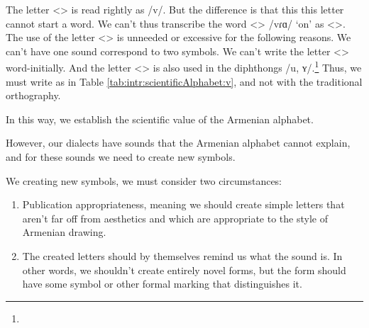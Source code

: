 The letter <> is read rightly as /v/. But the difference is that this this letter cannot start a word. We can't thus transcribe the word <> /vɾɑ/ `on' as <>. The use of the letter <> is unneeded or excessive for the following reasons. We can't have one sound correspond to two symbols. We can't write the letter <> word-initially. And the letter <> is also used in the diphthongs  /u, ʏ/.\footnote{} Thus, we must write as in Table \ref{tab:intr:scientificAlphabet:v}, and not with the traditional orthography. 



\begin{table}[H]
	\centering
	\caption{Transcribing the letter <> }\label{tab:intr:scientificAlphabet:v}
	\end{table}




In this way, we establish the scientific value of the Armenian alphabet.

However, our dialects have sounds that the Armenian alphabet cannot explain, and for these sounds we need to create new symbols. 

We creating new symbols, we must consider two circumstances:
\begin{enumerate}
	\item Publication appropriateness, meaning we should create simple letters that aren't far off from aesthetics and which are appropriate to the style of Armenian drawing. 
	\item The created letters should by themselves remind us what the sound is. In other words, we shouldn't create entirely novel forms, but the form should have some symbol or other formal marking that distinguishes it.
\end{enumerate}


